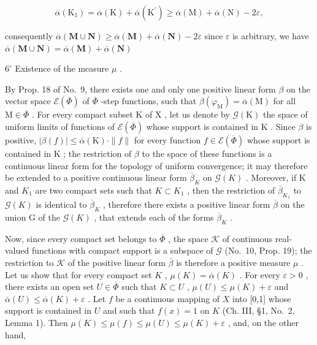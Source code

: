 \[
\overline {{{{\alpha}}}} \left(\mathrm{K} _ {1}\right) = \overline {{{{\alpha}}}} (\mathrm{K}) + \overline {{{{\alpha}}}} \left(\mathrm{K} ^ {\prime}\right) \geqslant \overline {{{{\alpha}}}} (\mathrm{M}) + \overline {{{{\alpha}}}} (\mathrm{N}) - 2 \varepsilon ,
\]

consequently \(\overline{\alpha} (\mathbf{M}\cup \mathbf{N})\geqslant \overline{\alpha} (\mathbf{M}) + \overline{\alpha} (\mathbf{N}) - 2\varepsilon\) since \(\varepsilon\) is arbitrary, we have \(\overline{\alpha} (\mathbf{M}\cup \mathbf{N}) = \overline{\alpha} (\mathbf{M}) + \overline{\alpha} (\mathbf{N})\)

\(6^{\circ}\) Existence of the measure \(\mu\) .

By Prop. 18 of No.~9, there exists one and only one positive linear form \(\beta\) on the vector space \(\mathcal{E}(\overline{\Phi})\) of \(\overline{\Phi}\) -step functions, such that \(\beta(\varphi_{\mathrm{M}}) = \overline{\alpha}(\mathrm{M})\) for all \(\mathrm{M} \in \overline{\Phi}\) . For every compact subset \(\mathrm{K}\) of \(\mathrm{X}\) , let us denote by \(\mathcal{G}(\mathrm{K})\) the space of uniform limits of functions of \(\mathcal{E}(\overline{\Phi})\) whose support is contained in \(\mathrm{K}\) . Since \(\beta\) is positive, \(|\beta(f)| \leqslant \overline{\alpha}(\mathrm{K}) \cdot \|f\|\) for every function \(f \in \mathcal{E}(\overline{\Phi})\) whose support is contained in \(\mathrm{K}\) ; the restriction of \(\beta\) to the space of these functions is a continuous linear form for the topology of uniform convergence; it may therefore be extended to a positive continuous linear form \(\overline{\beta}_{K}\) on \(\mathcal{G}(K)\) . Moreover, if K and \(K_{1}\) are two compact sets such that \(K \subset K_{1}\) , then the restriction of \(\overline{\beta}_{K_{1}}\) to \(\mathcal{G}(K)\) is identical to \(\overline{\beta}_{K}\) , therefore there exists a positive linear form \(\overline{\beta}\) on the union G of the \(\mathcal{G}(K)\) , that extends each of the forms \(\overline{\beta}_{K}\) .

Now, since every compact set belongs to \(\overline{\Phi}\) , the space \(\mathcal{K}\) of continuous real-valued functions with compact support is a subspace of \(\mathcal{G}\) (No.~10, Prop. 19); the restriction to \(\mathcal{K}\) of the positive linear form \(\overline{\beta}\) is therefore a positive measure \(\mu\) . Let us show that for every compact set \(K\) , \(\mu(K) = \overline{\alpha}(K)\) . For every \(\varepsilon > 0\) , there exists an open set \(U \in \overline{\Phi}\) such that \(K \subset U\) , \(\mu(U) \leqslant \mu(K) + \varepsilon\) and \(\overline{\alpha}(U) \leqslant \overline{\alpha}(K) + \varepsilon\) . Let \(f\) be a continuous mapping of \(X\) into {[}0,1{]} whose support is contained in \(U\) and such that \(f(x) = 1\) on \(K\) (Ch. III, §1, No.~2, Lemma 1). Then \(\mu(K) \leqslant \mu(f) \leqslant \mu(U) \leqslant \mu(K) + \varepsilon\) , and, on the other hand,

